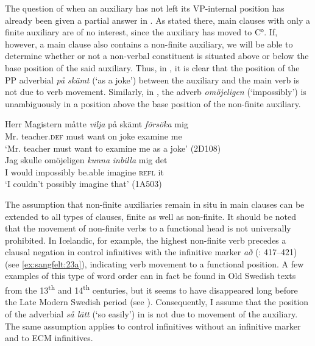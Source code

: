 \documentclass[output=paper, colorlinks, citecolor=brown]{langscibook}
\begin{document}
The question of when an auxiliary has not left its VP-internal position has already been given a partial answer in . As stated there, main clauses with only a finite auxiliary are of no interest, since the auxiliary has moved to C°. If, however, a main clause also contains a non-finite auxiliary, we will be able to determine whether or not a non-verbal constituent is situated above or below the base position of the said auxiliary. Thus, in , it is clear that the position of the PP adverbial \textit{på skämt} (‘as a joke’) between the auxiliary and the main verb is not due to verb movement. Similarly, in , the adverb \textit{omöjeligen} (‘impossibly’) is unambiguously in a position above the base position of the non-finite auxiliary.

\ea\label{ex:sangfelt:22}
\ea\label{ex:sangfelt:22a}
\gll Herr Magistern måtte \textit{vilja} {på} {skämt} \textit{försöka} mig \\ %
 Mr. teacher.\textsc{def} must want on joke examine me\\
\glt ‘Mr. teacher must want to examine me as a joke’ (2D108)\\
\ex\label{ex:sangfelt:22b}
\gll Jag skulle {omöjeligen} \textit{kunna} \textit{inbilla} mig det \\
 I would impossibly be.able imagine \textsc{refl} it\\
\glt ‘I couldn’t possibly imagine that’ (1A503)
\z
\z


The assumption that non-finite auxiliaries remain in situ in main clauses can be extended to all types of clauses, finite as well as non-finite. It should be noted that the movement of non-finite verbs to a functional head is not universally prohibited. In Icelandic, for example, the highest non-finite verb precedes a clausal negation in control infinitives with the infinitive marker \textit{að} (\citealt{Thrainsson2007}: 417–421) (see \ref{ex:sangfelt:23a}), indicating verb movement to a functional position. A few examples of this type of word order can in fact be found in Old Swedish texts from the 13\textsuperscript{th} and 14\textsuperscript{th} centuries, but it seems to have disappeared long before the Late Modern Swedish period (see \cites[161]{Delsing1999}[]{Falk2010Studier}[141]{Kalm2016Satsekvivalenta}). Consequently, I assume that the position of the adverbial \textit{så lätt} (‘so easily’) in  is not due to movement of the auxiliary. The same assumption applies to control infinitives without an infinitive marker and to ECM infinitives.
\end{document}
